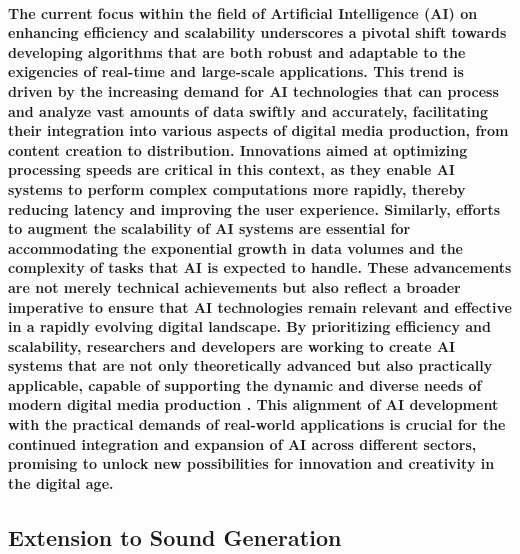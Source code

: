 \documentclass[11pt,a4paper,oneside]{report}
\begin{document}
\paragraph{The current focus within the field of Artificial Intelligence (AI) on enhancing efficiency and scalability underscores a pivotal shift towards developing algorithms that are both robust and adaptable to the exigencies of real-time and large-scale applications. This trend is driven by the increasing demand for AI technologies that can process and analyze vast amounts of data swiftly and accurately, facilitating their integration into various aspects of digital media production, from content creation to distribution. Innovations aimed at optimizing processing speeds are critical in this context, as they enable AI systems to perform complex computations more rapidly, thereby reducing latency and improving the user experience. Similarly, efforts to augment the scalability of AI systems are essential for accommodating the exponential growth in data volumes and the complexity of tasks that AI is expected to handle. These advancements are not merely technical achievements but also reflect a broader imperative to ensure that AI technologies remain relevant and effective in a rapidly evolving digital landscape. By prioritizing efficiency and scalability, researchers and developers are working to create AI systems that are not only theoretically advanced but also practically applicable, capable of supporting the dynamic and diverse needs of modern digital media production \cite{habibian2021skip}. This alignment of AI development with the practical demands of real-world applications is crucial for the continued integration and expansion of AI across different sectors, promising to unlock new possibilities for innovation and creativity in the digital age.}

\subsection{Extension to Sound Generation}
\end{document}
